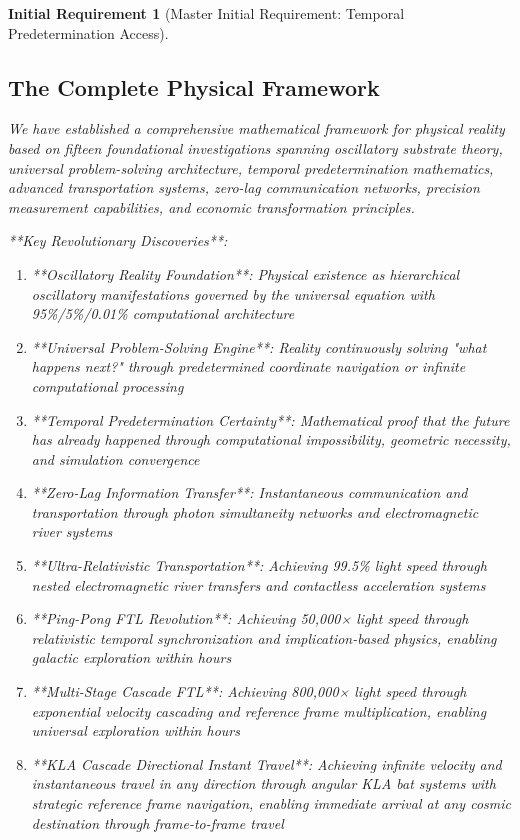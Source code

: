 \documentclass[12pt,a4paper]{article}
\newtheorem{requirement}[theorem]{Initial Requirement}
\theoremstyle{remark}
\begin{document}
\begin{requirement}[Master Initial Requirement: Temporal Predetermination Access]
\subsection{The Complete Physical Framework}

We have established a comprehensive mathematical framework for physical reality based on fifteen foundational investigations spanning oscillatory substrate theory, universal problem-solving architecture, temporal predetermination mathematics, advanced transportation systems, zero-lag communication networks, precision measurement capabilities, and economic transformation principles.

**Key Revolutionary Discoveries**:

\begin{enumerate}
\item **Oscillatory Reality Foundation**: Physical existence as hierarchical oscillatory manifestations governed by the universal equation with 95\%/5\%/0.01\% computational architecture
\item **Universal Problem-Solving Engine**: Reality continuously solving "what happens next?" through predetermined coordinate navigation or infinite computational processing
\item **Temporal Predetermination Certainty**: Mathematical proof that the future has already happened through computational impossibility, geometric necessity, and simulation convergence
\item **Zero-Lag Information Transfer**: Instantaneous communication and transportation through photon simultaneity networks and electromagnetic river systems
\item **Ultra-Relativistic Transportation**: Achieving 99.5\% light speed through nested electromagnetic river transfers and contactless acceleration systems
\item **Ping-Pong FTL Revolution**: Achieving 50,000× light speed through relativistic temporal synchronization and implication-based physics, enabling galactic exploration within hours
\item **Multi-Stage Cascade FTL**: Achieving 800,000× light speed through exponential velocity cascading and reference frame multiplication, enabling universal exploration within hours
\item **KLA Cascade Directional Instant Travel**: Achieving infinite velocity and instantaneous travel in any direction through angular KLA bat systems with strategic reference frame navigation, enabling immediate arrival at any cosmic destination through frame-to-frame travel
\end{enumerate}


\end{requirement}
\end{document}
